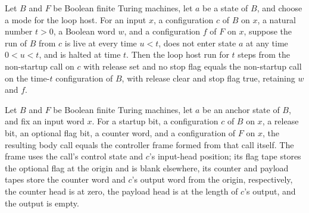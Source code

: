 \begin{lemma}
\label{Turing.FinTM.loopHost_halt_return}
\leanok
{}
Let $B$ and $F$ be Boolean finite Turing machines, let $a$ be a state of $B$, and choose
a mode for the loop host. For an input $x$, a configuration $c$ of $B$ on $x$, a natural
number $t>0$, a Boolean word $w$, and a configuration $f$ of $F$ on $x$, suppose the run
of $B$ from $c$ is live at every time $u<t$, does not enter state $a$ at any time
$0<u<t$, and is halted at time $t$. Then the loop host run for $t$ steps from the
non-startup call on $c$ with release set and no stop flag equals the non-startup call on
the time-$t$ configuration of $B$, with release clear and stop flag true, retaining $w$
and $f$.
\end{lemma}

\begin{lemma}
\label{Turing.FinTM.loopCall_frame}
\leanok
{}
Let $B$ and $F$ be Boolean finite Turing machines, let $a$ be an anchor state of $B$,
and fix an input word $x$. For a startup bit, a configuration $c$ of $B$ on $x$, a
release bit, an optional flag bit, a counter word, and a configuration of $F$ on $x$,
the resulting body call equals the controller frame formed from that call itself. The
frame uses the call's control state and $c$'s input-head position; its flag tape stores
the optional flag at the origin and is blank elsewhere, its counter and payload tapes
store the counter word and $c$'s output word from the origin, respectively, the counter
head is at zero, the payload head is at the length of $c$'s output, and the output is
empty.
\end{lemma}

